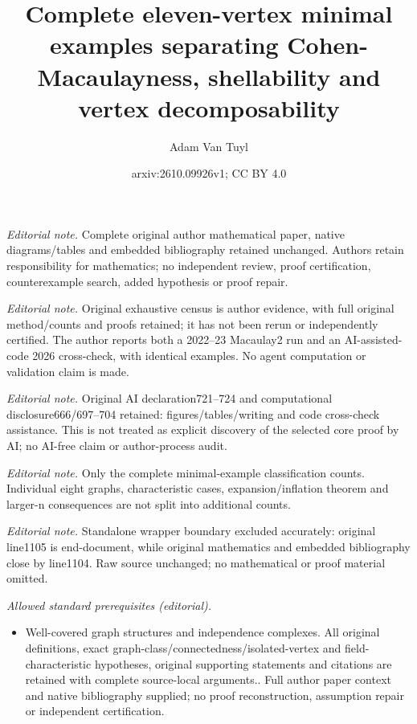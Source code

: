 \documentclass[10pt,a4paper]{amsart}
\title{Complete eleven-vertex minimal examples separating Cohen-Macaulayness, shellability and vertex decomposability}
\author{Adam Van Tuyl}
\date{arxiv:2610.09926v1; CC BY 4.0}
\theoremstyle{plain}
\theoremstyle{definition}
\theoremstyle{remark}
\numberwithin{equation}{section}
\numberwithin{equation}{section}
\begin{document}
\maketitle
\noindent\textit{Editorial note.} Complete original author mathematical paper, native diagrams/tables and embedded bibliography retained unchanged. Authors retain responsibility for mathematics; no independent review, proof certification, counterexample search, added hypothesis or proof repair.\par\medskip
\noindent\textit{Editorial note.} Original exhaustive census is author evidence, with full original method/counts and proofs retained; it has not been rerun or independently certified. The author reports both a 2022--23 Macaulay2 run and an AI-assisted-code 2026 cross-check, with identical examples. No agent computation or validation claim is made.\par\medskip
\noindent\textit{Editorial note.} Original AI declaration721--724 and computational disclosure666/697--704 retained: figures/tables/writing and code cross-check assistance. This is not treated as explicit discovery of the selected core proof by AI; no AI-free claim or author-process audit.\par\medskip
\noindent\textit{Editorial note.} Only the complete minimal-example classification counts. Individual eight graphs, characteristic cases, expansion/inflation theorem and larger-n consequences are not split into additional counts.\par\medskip
\noindent\textit{Editorial note.} Standalone wrapper boundary excluded accurately: original line1105 is end-document, while original mathematics and embedded bibliography close by line1104. Raw source unchanged; no mathematical or proof material omitted.\par\medskip
\noindent\textit{Allowed standard prerequisites (editorial).}\begin{itemize}
\item Well-covered graph structures and independence complexes. All original definitions, exact graph-class/connectedness/isolated-vertex and field-characteristic hypotheses, original supporting statements and citations are retained with complete source-local arguments.. Full author paper context and native bibliography supplied; no proof reconstruction, assumption repair or independent certification.
\end{itemize}\medskip
\end{document}
